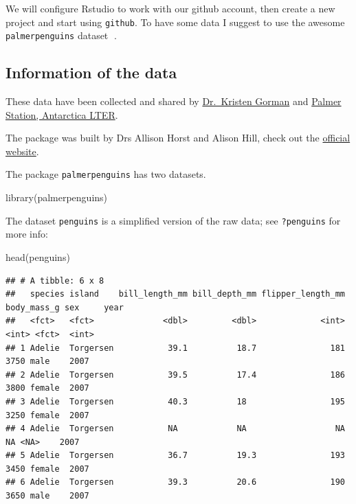 \documentclass[
  12pt,
]{book}
\newenvironment{Shaded}{\begin{snugshade}}{\end{snugshade}}
\newcommand{\FunctionTok}[1]{\textcolor[rgb]{0.00,0.00,0.00}{#1}}
\newcommand{\NormalTok}[1]{#1}
\begin{document}
We will configure Rstudio to work with our github account, then create a new project and start using \texttt{github}. To have some data I suggest to use the awesome \texttt{palmerpenguins} dataset 🐧.

\hypertarget{information-of-the-data}{%
\subsection{Information of the data}\label{information-of-the-data}}

These data have been collected and shared by \href{https://www.uaf.edu/cfos/people/faculty/detail/kristen-gorman.php}{Dr.~Kristen Gorman} and \href{https://pal.lternet.edu/}{Palmer Station, Antarctica LTER}.

The package was built by Drs Allison Horst and Alison Hill, check out the \href{https://allisonhorst.github.io/palmerpenguins/}{official website}.

The package \texttt{palmerpenguins} has two datasets.

\begin{Shaded}
\begin{Highlighting}[]
\FunctionTok{library}\NormalTok{(palmerpenguins)}
\end{Highlighting}
\end{Shaded}

The dataset \texttt{penguins} is a simplified version of the raw data; see \texttt{?penguins} for more info:

\begin{Shaded}
\begin{Highlighting}[]
\FunctionTok{head}\NormalTok{(penguins)}
\end{Highlighting}
\end{Shaded}

\begin{verbatim}
## # A tibble: 6 x 8
##   species island    bill_length_mm bill_depth_mm flipper_length_mm body_mass_g sex     year
##   <fct>   <fct>              <dbl>         <dbl>             <int>       <int> <fct>  <int>
## 1 Adelie  Torgersen           39.1          18.7               181        3750 male    2007
## 2 Adelie  Torgersen           39.5          17.4               186        3800 female  2007
## 3 Adelie  Torgersen           40.3          18                 195        3250 female  2007
## 4 Adelie  Torgersen           NA            NA                  NA          NA <NA>    2007
## 5 Adelie  Torgersen           36.7          19.3               193        3450 female  2007
## 6 Adelie  Torgersen           39.3          20.6               190        3650 male    2007
\end{verbatim}
\end{document}
